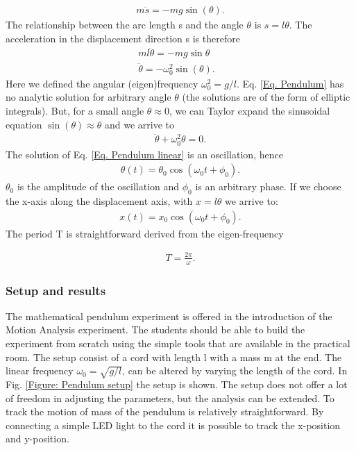 \documentclass{article}
\begin{document}
\begin{align}
    m\ddot{s} = -mg\sin(\theta).
\end{align}
The relationship between the arc length s and the angle $\theta$ is $s=l\theta$. The acceleration in the displacement direction s is therefore
\begin{align}
    ml\ddot{\theta} = -mg\sin{\theta} & \\
    \ddot{\theta} = -\omega_0^2\sin(\theta).
    \label{Eq. Pendulum}
\end{align}
Here we defined the angular (eigen)frequency $\omega_0^2 = g/l$. Eq. \ref{Eq. Pendulum} has no analytic solution for arbitrary angle $\theta$ (the solutions are of the form of elliptic integrals). But, for a small angle $\theta \approx 0$, we can Taylor expand the sinusoidal equation $\sin(\theta)\approx \theta$ and we arrive to 
\begin{align}
    \ddot{\theta} + \omega_0^2 \theta = 0.
    \label{Eq. Pendulum linear}
\end{align}
The solution of Eq. \ref{Eq. Pendulum linear} is an oscillation, hence 
\begin{align}
    \theta(t) = \theta_0\cos(\omega_0 t + \phi_0).
\end{align}
$\theta_0$ is the amplitude of the oscillation and $\phi_0$ is an arbitrary phase. 
If we choose the x-axis along the displacement axis, with $x = l\theta$ we arrive to:
\begin{align}
    x(t) = x_0\cos(\omega_0 t + \phi_0).
\end{align}
The period T is straightforward derived from the eigen-frequency

\begin{align}
    T=\frac{2\pi}{\omega}.
\end{align}

\subsubsection{Setup and results}
The mathematical pendulum experiment is offered in the introduction of the Motion Analysis experiment. The students should be able to build the experiment from scratch using the simple tools that are available in the practical room. The setup consist of a cord with length l with a mass m at the end. The linear frequency $\omega_0 = \sqrt{g/l}$, can be altered by varying the length of the cord. In Fig. \ref{Figure: Pendulum setup} the setup is shown. The setup does not offer a lot of freedom in adjusting the parameters, but the analysis can be extended. To track the motion of mass of the pendulum is relatively straightforward. By connecting a simple LED light to the cord it is possible to track the x-position and y-position. 
\end{document}
